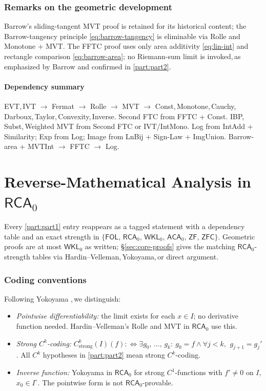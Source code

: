 \documentclass[11pt,reqno]{amsart}
\newcommand{\comma}{,\,\allowbreak}
\theoremstyle{redplain}
\begin{document}
\section{Remarks on the geometric development}

Barrow's sliding-tangent MVT proof is retained for its historical content; the Barrow-tangency principle \autoref{eq:barrow-tangency} is eliminable via Rolle and Monotone + MVT. The FFTC proof uses only area additivity \autoref{eq:lin-int} and rectangle comparison \autoref{eq:barrow-area}; no Riemann-sum limit is invoked\comma as emphasized by Barrow \cite{Barrow1916} and confirmed in \autoref{part:part2}.

\subsection*{Dependency summary}

EVT\comma IVT $\to$ Fermat $\to$ Rolle $\to$ MVT $\to$ Const\comma Monotone\comma Cauchy\comma Darboux\comma Taylor\comma Convexity\comma Inverse. Second FTC from FFTC + Const. IBP\comma Subst\comma Weighted MVT from Second FTC or IVT/IntMono. Log from IntAdd + Similarity; Exp from Log; Image from LnBij + Sign-Law + ImgUnion. Barrow-area + MVTInt $\to$ FFTC $\to$ Log.

\part{Reverse-Mathematical Analysis in $\mathsf{RCA}_0$}
\label{part:part2}
\noindent Every \autoref{part:part1} entry reappears as a tagged statement with a dependency table and an exact strength in $\{\textsf{FOL}\comma\textsf{RCA}_0\comma\textsf{WKL}_0\comma\textsf{ACA}_0\comma\textsf{ZF}\comma\textsf{ZFC}\}$. Geometric proofs are at most $\textsf{WKL}_0$ as written; \S\ref{sec:core-proofs} gives the matching $\textsf{RCA}_0$-strength tables via Hardin--Velleman\comma Yokoyama\comma or direct argument.

\section{Coding conventions}
\label{sec:coding}

\noindent Following Yokoyama \cite{Yokoyama2010}\comma we distinguish:
\begin{itemize}
	\item \emph{Pointwise differentiability:} the limit exists for each $x\in I$; no derivative function needed. Hardin--Velleman's Rolle and MVT in $\textsf{RCA}_0$ use this.
	\item \emph{Strong $C^k$-coding:} $C^k_{\mathrm{strong}}(I)(f):\iff\exists g_0\comma\dots\comma g_k:\ g_0=f\wedge\forall j<k\comma\ g_{j+1}=g_j'$. All $C^k$ hypotheses in \autoref{part:part2} mean strong $C^k$-coding.
	\item \emph{Inverse function:} Yokoyama \cite[Thm.~3.22]{Yokoyama2010} in $\textsf{RCA}_0$ for strong $C^1$-functions with $f'\ne0$ on $I$\comma $x_0\in I^\circ$. The pointwise form is not $\textsf{RCA}_0$-provable.
\end{itemize}
\end{document}
